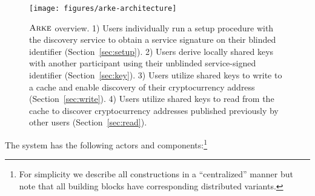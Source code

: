 \documentclass[11pt,letterpaper]{article}
\theoremstyle{definition}
\newcommand{\sys}{\textsc{Arke}\xspace}
\begin{document}

\begin{figure}[h]
  \centering
  \texttt{[image: figures/arke-architecture]}
  \caption{\small $\sys$ overview. 1) Users individually run a setup procedure
    with the discovery service to obtain a service signature on their blinded
    identifier (Section~\ref{sec:setup}). 2) Users derive locally shared keys with
    another participant using their unblinded service-signed identifier
    (Section~\ref{sec:key}). 3) Users utilize shared keys to write to a cache and
    enable discovery of their cryptocurrency address (Section~\ref{sec:write}). 4)
    Users utilize shared keys to read from the cache to discover cryptocurrency
    addresses published previously by other users (Section~\ref{sec:read}).}
  \label{fig:system}
\end{figure}

The system has the following actors and components:\footnote{For simplicity we
  describe all constructions in a ``centralized'' manner but note that all
  building blocks have corresponding distributed variants.}
\end{document}
